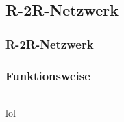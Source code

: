 \subsection{R-2R-Netzwerk} %
\label{sub:R-2R-Netzwerk}
\begin{frame}
    \frametitle{R-2R-Netzwerk}
    \framesubtitle{}
    \begin{figure}[H]
        \begin{center}
        \end{center}
    \end{figure}
\end{frame}

\begin{frame}
    \frametitle{Funktionsweise}
    \framesubtitle{}
    \begin{columns}[c]
            lol    
            \begin{figure}[H]
                 \begin{center}
                 \end{center}
            \end{figure}
    \end{columns}
\end{frame}
